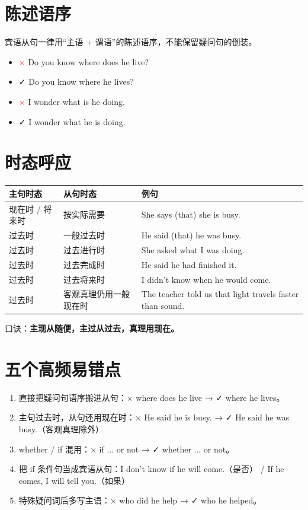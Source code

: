 \documentclass[11pt,a4paper]{ctexart}
\begin{document}
\section{陈述语序}
宾语从句一律用“主语 + 谓语”的陈述语序，不能保留疑问句的倒装。
\begin{itemize}[leftmargin=1.4em]
\item \textcolor{red}{×} Do you know where does he live?
\item \textcolor{green!50!black}{✓} Do you know where he lives?
\item \textcolor{red}{×} I wonder what is he doing.
\item \textcolor{green!50!black}{✓} I wonder what he is doing.
\end{itemize}

\section{时态呼应}
\begin{center}
\begin{tabular}{p{3.6cm}p{4.4cm}p{7.2cm}}
\hline
\textbf{主句时态} & \textbf{从句时态} & \textbf{例句}\\
\hline
现在时 / 将来时 & 按实际需要 & She says (that) she is busy.\\
过去时 & 一般过去时 & He said (that) he was busy.\\
过去时 & 过去进行时 & She asked what I was doing.\\
过去时 & 过去完成时 & He said he had finished it.\\
过去时 & 过去将来时 & I didn't know when he would come.\\
过去时 & 客观真理仍用一般现在时 & The teacher told us that light travels faster than sound.\\
\hline
\end{tabular}
\end{center}
口诀：\textbf{主现从随便，主过从过去，真理用现在。}

\section{五个高频易错点}
\begin{enumerate}[leftmargin=1.4em]
\item 直接把疑问句语序搬进从句：× where does he live → ✓ where he lives。
\item 主句过去时，从句还用现在时：× He said he is busy. → ✓ He said he was busy.（客观真理除外）
\item whether / if 混用：× if ... or not → ✓ whether ... or not。
\item 把 if 条件句当成宾语从句：I don't know if he will come.（是否） / If he comes, I will tell you.（如果）
\item 特殊疑问词后多写主语：× who did he help → ✓ who he helped。
\end{enumerate}
\end{document}
